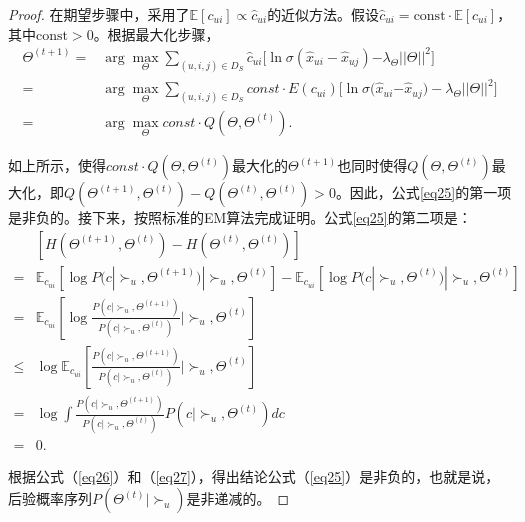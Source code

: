 \begin{proof}
\par
在期望步骤中，采用了$\mathbb{E}[c_{ui}] \propto \hat{c}_{ui}$的近似方法。假设$\hat{c}_{ui} = \text{const} \cdot \mathbb{E}[c_{ui}]$，其中$\text{const} > 0$。根据最大化步骤，
\begin{equation}\label{eq26}
	\begin{split}
		{\Theta ^{(t+1)}} =& \arg \mathop {\max }\limits_\Theta  \sum\nolimits_{(u,i,j) \in {D_S}} {{{\hat c}_{ui}}[\ln \sigma ({{\hat x}_{ui}} - {{\hat x}_{uj}})}
		{- {\lambda _\Theta }||\Theta |{|^2}]}
		\\=& \arg \mathop {\max }\limits_\Theta  \sum\nolimits_{(u,i,j) \in {D_S}} {const \cdot E({c_{ui}})[\ln \sigma ({{\hat x}_{ui}} }
		{- {{\hat x}_{uj} )}- {\lambda _\Theta }||\Theta |{|^2}]}
		\\=& \arg \mathop {\max }\limits_\Theta  const \cdot Q(\Theta ,{\Theta ^{(t)}}).
	\end{split}
\end{equation}
\par
如上所示，使得$const \cdot Q(\Theta ,{\Theta ^{(t)}})$最大化的${\Theta ^{(t + 1)}}$也同时使得$Q(\Theta ,{\Theta ^{(t)}})$最大化，即$ Q({\Theta ^{(t + 1)}},{\Theta ^{(t)}}) - Q({\Theta ^{(t)}},{\Theta ^{(t)}}) > 0$。因此，公式\eqref{eq25}的第一项是非负的。接下来，按照标准的EM算法\cite{Dempster:1977:RSS}完成证明。公式\eqref{eq25}的第二项是：
\begin{equation}\label{eq27}
	\begin{aligned}
		&[H({\Theta ^{(t + 1)}},{\Theta ^{(t)}}) - H({\Theta ^{(t)}},{\Theta ^{(t)}})]\\
		=& {\mathbb{E}_{{c_{ui}}}}[\log P(c|{ \succ _u},{\Theta ^{(t + 1)}})|{ \succ _u},{\Theta ^{(t)}}] -{\mathbb{E}_{{c_{ui}}}}[\log P(c|{ \succ _u},{\Theta ^{(t)}})|{ \succ _u},{\Theta ^{(t)}}]\\
		=& {\mathbb{E}_{{c_{ui}}}}[\log \frac{{P(c|{ \succ _u},{\Theta ^{(t + 1)}})}}{{P(c|{ \succ _u},{\Theta ^{(t)}})}}|{ \succ _u},{\Theta ^{(t)}}]\\
		\le& \log {\mathbb{E}_{{c_{ui}}}}[\frac{{P(c|{ \succ _u},{\Theta ^{(t + 1)}})}}{{P(c|{ \succ _u},{\Theta ^{(t)}})}}|{ \succ _u},{\Theta ^{(t)}}]\\
		=& \log \int {\frac{{P(c|{ \succ _u},{\Theta ^{(t + 1)}})}}{{P(c|{ \succ _u},{\Theta ^{(t)}})}}P(c|{ \succ _u},{\Theta ^{(t)}})} dc\\
		=& 0.
	\end{aligned}
\end{equation}

\par
根据公式（\eqref{eq26}）和（\eqref{eq27}），得出结论公式（\eqref{eq25}）是非负的，也就是说，后验概率序列$P({\Theta ^{(t)}}|{ \succ _u})$是非递减的。


\end{proof}
